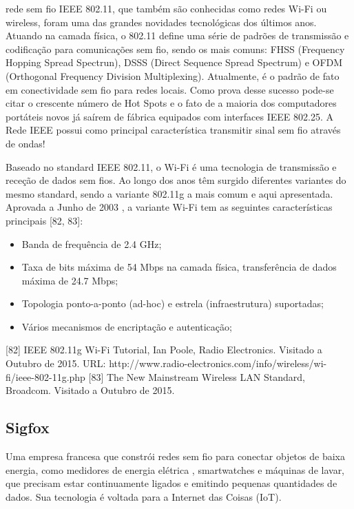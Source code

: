 rede sem fio IEEE 802.11, que também são conhecidas como redes Wi-Fi ou wireless, foram uma das grandes novidades tecnológicas dos últimos anos. Atuando na camada física, o 802.11 define uma série de padrões de transmissão e codificação para comunicações sem fio, sendo os mais comuns: FHSS (Frequency Hopping Spread Spectrun), DSSS (Direct Sequence Spread Spectrum) e OFDM (Orthogonal Frequency Division Multiplexing). Atualmente, é o padrão de fato em conectividade sem fio para redes locais. Como prova desse sucesso pode-se citar o crescente número de Hot Spots e o fato de a maioria dos computadores portáteis novos já saírem de fábrica equipados com interfaces IEEE 802.25. A Rede IEEE possui como principal característica transmitir sinal sem fio através de ondas!









Baseado no standard IEEE 802.11, o Wi-Fi é uma tecnologia de transmissão e receção de dados sem fios. Ao longo dos anos têm surgido diferentes variantes do mesmo standard, sendo
a variante 802.11g a mais comum e aqui apresentada.
Aprovada a Junho de 2003 , a variante Wi-Fi tem as seguintes características principais
[82, 83]:

\begin{itemize}
	\item Banda de frequência de 2.4 GHz;
	\item Taxa de bits máxima de 54 Mbps na camada física, transferência de dados máxima de 24.7 Mbps;
	\item Topologia ponto-a-ponto (ad-hoc) e estrela (infraestrutura) suportadas;
	\item Vários mecanismos de encriptação e autenticação;
\end{itemize}




[82] IEEE 802.11g Wi-Fi Tutorial, Ian Poole, Radio Electronics. Visitado a Outubro de 2015.
URL: http://www.radio-electronics.com/info/wireless/wi-fi/ieee-802-11g.php
[83] The New Mainstream Wireless LAN Standard, Broadcom. Visitado a Outubro de 2015.


\subsection{Sigfox}

Uma empresa francesa que constrói redes sem fio para conectar objetos de baixa energia, como medidores de energia elétrica , smartwatches e máquinas de lavar, que precisam estar continuamente ligados e emitindo pequenas quantidades de dados. Sua tecnologia é voltada para a Internet das Coisas (IoT).


